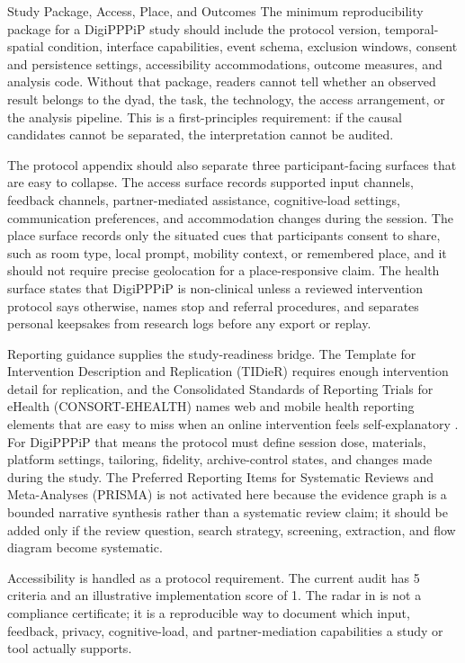 \documentclass[
  ignorenonframetext,
]{beamer}
\begin{document}
\begin{frame}{Study Package, Access, Place,
and Outcomes}
\protect{}\label{study-package-access-place-and-outcomes}
The minimum reproducibility package for a DigiPPPiP study should include
the protocol version, temporal-spatial condition, interface
capabilities, event schema, exclusion windows, consent and persistence
settings, accessibility accommodations, outcome measures, and analysis
code. Without that package, readers cannot tell whether an observed
result belongs to the dyad, the task, the technology, the access
arrangement, or the analysis pipeline. This is a first-principles
requirement: if the causal candidates cannot be separated, the
interpretation cannot be audited.

The protocol appendix should also separate three participant-facing
surfaces that are easy to collapse. The access surface records supported
input channels, feedback channels, partner-mediated assistance,
cognitive-load settings, communication preferences, and accommodation
changes during the session. The place surface records only the situated
cues that participants consent to share, such as room type, local
prompt, mobility context, or remembered place, and it should not require
precise geolocation for a place-responsive claim. The health surface
states that DigiPPPiP is non-clinical unless a reviewed intervention
protocol says otherwise, names stop and referral procedures, and
separates personal keepsakes from research logs before any export or
replay.

Reporting guidance supplies the study-readiness bridge. The Template for
Intervention Description and Replication (TIDieR) requires enough
intervention detail for replication, and the Consolidated Standards of
Reporting Trials for eHealth (CONSORT-EHEALTH) names web and mobile
health reporting elements that are easy to miss when an online
intervention feels self-explanatory . For DigiPPPiP that means the protocol
must define session dose, materials, platform settings, tailoring,
fidelity, archive-control states, and changes made during the study. The
Preferred Reporting Items for Systematic Reviews and Meta-Analyses
(PRISMA) is not activated here because the evidence graph is a bounded
narrative synthesis rather than a systematic review claim; it should be
added only if the review question, search strategy, screening,
extraction, and flow diagram become systematic.

Accessibility is handled as a protocol requirement. The current audit
has 5 criteria and an illustrative implementation score of 1. The radar
in  is not a compliance
certificate; it is a reproducible way to document which input, feedback,
privacy, cognitive-load, and partner-mediation capabilities a study or
tool actually supports.


\end{frame}
\end{document}
